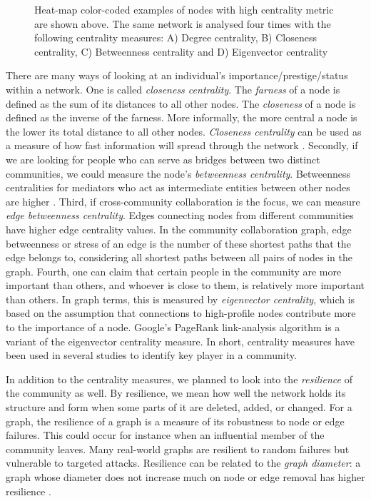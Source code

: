 \documentclass{acm_proc_article-sp}
\begin{document}
\begin{figure}[!ht]
\centering
{}
\caption{Heat-map color-coded examples of nodes with high centrality metric are shown above. The same network is analysed four times with the following centrality measures:  A) Degree centrality, B) Closeness centrality, C) Betweenness centrality and D) Eigenvector centrality \cite{Rocchini}}
\label{figureCentrality}
\end{figure}

There are many ways of looking at an individual's importance/prestige/status within a network. One is called \textit{closeness centrality}. The \textit{farness} of a node is defined as the sum of its distances to all other nodes. The \textit{closeness} of a node is defined as the inverse of the farness. More informally, the more central a node is the lower its total distance to all other nodes. \textit{Closeness centrality} can be used as a measure of how fast information will spread through the network \cite{Chakrabarti}. Secondly, if we are looking for people who can serve as bridges between two distinct communities, we could measure the node's \textit{betweenness centrality}. Betweenness centralities for mediators who act as intermediate entities between other nodes are higher \cite{Chakrabarti}.  Third, if cross-community collaboration is the focus, we can measure \textit{edge betweenness centrality}.  Edges connecting nodes from different communities have higher edge centrality values. In the community collaboration graph, edge betweenness or stress of an edge is the number of these shortest paths that the edge belongs to, considering all shortest paths between all pairs of nodes in the graph. Fourth, one can claim that certain people in the community are more important than others, and whoever is close to them, is relatively more important than others. In graph terms, this is measured by \textit{eigenvector centrality}, which is based on the assumption that connections to high-profile nodes contribute more to the importance of a node. Google's PageRank link-analysis algorithm \cite{Page} is a variant of the eigenvector centrality measure. In short, centrality measures have been used in several studies to identify key player in a community.

In addition to the centrality measures, we planned to look into the \textit{resilience} of the community as well. By resilience, we mean how well the network holds its structure and form when some parts of it are deleted, added, or changed. For a graph, the resilience of a graph is a measure of its robustness to node or edge failures. This could occur for instance when an influential member of the community leaves. Many real-world graphs are resilient to random failures but vulnerable to targeted attacks. Resilience can be related to the \textit{graph diameter}: a graph whose diameter does not increase much on node or edge removal has higher resilience \cite{Chakrabarti}.
\end{document}
